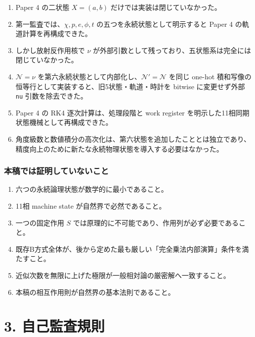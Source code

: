 \documentclass[
  a4paper,
]{ltjsarticle}
\providecommand{\tightlist}{%
  \setlength{\itemsep}{0pt}\setlength{\parskip}{0pt}}
\begin{document}
\begin{enumerate}
\def\labelenumi{\arabic{enumi}.}
\tightlist
\item
  Paper 4 の二状態 \(X=(a,b)\) だけでは実装は閉じていなかった。
\item
  第一監査では、\(\chi,p,e,\phi,t\) の五つを永続状態として明示すると
  Paper 4 の軌道計算を再構成できた。
\item
  しかし放射反作用核で \(\nu\)
  が外部引数として残っており、五状態系は完全には閉じていなかった。
\item
  \(\mathcal N=\nu\)
  を第六永続状態として内部化し、\(\mathcal N'=\mathcal N\) を同じ
  one-hot 積和写像の恒等行として実装すると、旧5状態・軌道・時計を
  bitwise に変更せず外部 \texttt{nu} 引数を除去できた。
\item
  Paper 4 の RK4 逐次計算は、処理段階と work register
  を明示した11相同期状態機械として再構成できた。
\item
  角度級数と数値積分の高次化は、第六状態を追加したこととは独立であり、精度向上のために新たな永続物理状態を導入する必要はなかった。
\end{enumerate}

\subsubsection{本稿では証明していないこと}\label{ux672cux7a3fux3067ux306fux8a3cux660eux3057ux3066ux3044ux306aux3044ux3053ux3068}

\begin{enumerate}
\def\labelenumi{\arabic{enumi}.}
\tightlist
\item
  六つの永続論理状態が数学的に最小であること。
\item
  11相 machine state が自然界で必然であること。
\item
  一つの固定作用 \(S\)
  では原理的に不可能であり、作用列が必ず必要であること。
\item
  既存B方式全体が、後から定めた最も厳しい「完全乗法内部演算」条件を満たすこと。
\item
  近似次数を無限に上げた極限が一般相対論の厳密解へ一致すること。
\item
  本稿の相互作用則が自然界の基本法則であること。
\end{enumerate}

\section{3. 自己監査規則}\label{ux81eaux5df1ux76e3ux67fbux898fux5247}
\end{document}
